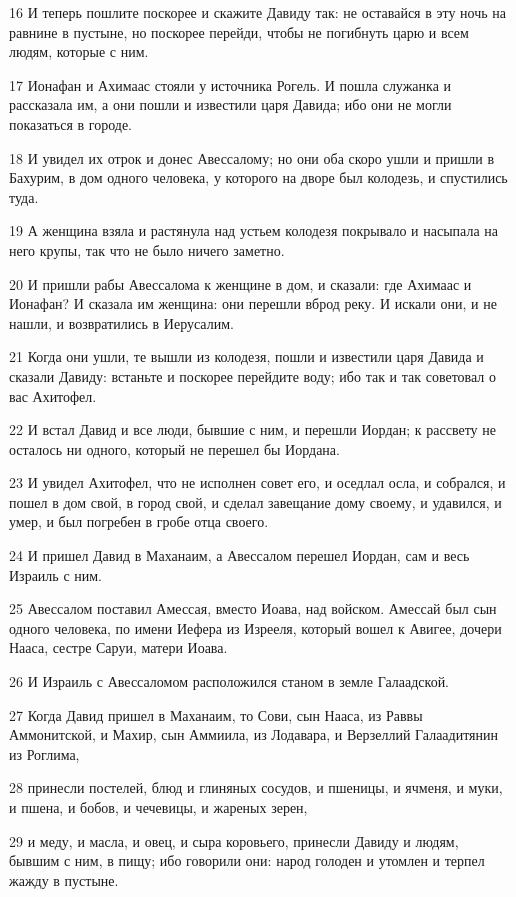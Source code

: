 \par 16 И теперь пошлите поскорее и скажите Давиду так: не оставайся в эту ночь на равнине в пустыне, но поскорее перейди, чтобы не погибнуть царю и всем людям, которые с ним.
\par 17 Ионафан и Ахимаас стояли у источника Рогель. И пошла служанка и рассказала им, а они пошли и известили царя Давида; ибо они не могли показаться в городе.
\par 18 И увидел их отрок и донес Авессалому; но они оба скоро ушли и пришли в Бахурим, в дом одного человека, у которого на дворе был колодезь, и спустились туда.
\par 19 А женщина взяла и растянула над устьем колодезя покрывало и насыпала на него крупы, так что не было ничего заметно.
\par 20 И пришли рабы Авессалома к женщине в дом, и сказали: где Ахимаас и Ионафан? И сказала им женщина: они перешли вброд реку. И искали они, и не нашли, и возвратились в Иерусалим.
\par 21 Когда они ушли, те вышли из колодезя, пошли и известили царя Давида и сказали Давиду: встаньте и поскорее перейдите воду; ибо так и так советовал о вас Ахитофел.
\par 22 И встал Давид и все люди, бывшие с ним, и перешли Иордан; к рассвету не осталось ни одного, который не перешел бы Иордана.
\par 23 И увидел Ахитофел, что не исполнен совет его, и оседлал осла, и собрался, и пошел в дом свой, в город свой, и сделал завещание дому своему, и удавился, и умер, и был погребен в гробе отца своего.
\par 24 И пришел Давид в Маханаим, а Авессалом перешел Иордан, сам и весь Израиль с ним.
\par 25 Авессалом поставил Амессая, вместо Иоава, над войском. Амессай был сын одного человека, по имени Иефера из Изрееля, который вошел к Авигее, дочери Нааса, сестре Саруи, матери Иоава.
\par 26 И Израиль с Авессаломом расположился станом в земле Галаадской.
\par 27 Когда Давид пришел в Маханаим, то Сови, сын Нааса, из Раввы Аммонитской, и Махир, сын Аммиила, из Лодавара, и Верзеллий Галаадитянин из Роглима,
\par 28 принесли постелей, блюд и глиняных сосудов, и пшеницы, и ячменя, и муки, и пшена, и бобов, и чечевицы, и жареных зерен,
\par 29 и меду, и масла, и овец, и сыра коровьего, принесли Давиду и людям, бывшим с ним, в пищу; ибо говорили они: народ голоден и утомлен и терпел жажду в пустыне.

